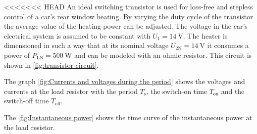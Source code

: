 

<<<<<<< HEAD
An ideal switching transistor is used for loss-free and stepless control of a car's rear window heating.
By varying the duty cycle of the transistor the average value of the heating power can be adjusted. The voltage in the car's electrical system is assumed to be constant with $U_1 = \SI{14}{\volt}$. The heater is dimensioned in such a way
that at its nominal voltage $ U_{\mathrm{2N}} = \SI{14}{\volt}$ it consumes a power of $ P_{\mathrm{LN}} = \SI{500}{\watt}$ and
can be modeled with an ohmic resistor. This circuit is shown in \autoref{fig:transistor circuit}.


\begin{solutionblock}
The graph \autoref{fig:Currents and voltages during the period} shows the voltages and currents at the load resistor with the period $T_{\mathrm{s}}$, the switch-on time $T_{\mathrm{on}}$ and the switch-off time $T_{\mathrm{off}}$. 


            
\end{solutionblock}



\begin {solutionblock}
The \autoref{fig:Instantaneous power} shows the time curve of the instantaneous power at the load resistor.



\end{solutionblock}


